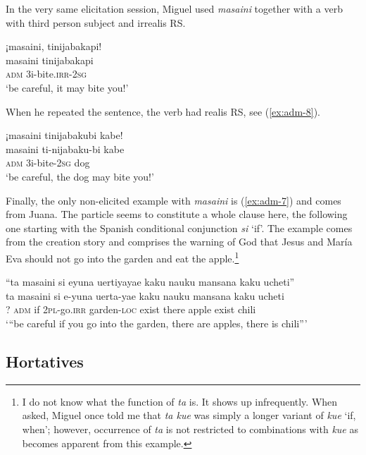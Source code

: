 In the very same elicitation session, Miguel used \textit{masaini} together with a verb with third person subject and irrealis RS.

\ea\label{ex:adm-6}
\begingl
\glpreamble ¡masaini, tinijabakapi!\\
\gla masaini tinijabakapi\\
\glb \textsc{adm} 3i-bite.\textsc{irr}-2\textsc{sg}\\
\glft ‘be careful, it may bite you!’
\endgl
\trailingcitation{[mrx-e150219s.148]}
\xe

When he repeated the sentence, the verb had realis RS, see (\ref{ex:adm-8}).

\ea\label{ex:adm-8}
\begingl
\glpreamble ¡masaini tinijabakubi kabe!\\
\gla masaini ti-nijabaku-bi kabe\\
\glb \textsc{adm} 3i-bite-2\textsc{sg} dog\\
\glft ‘be careful, the dog may bite you!’
\endgl
\trailingcitation{[mrx-e150219s.149]}
\xe
{}

Finally, the only non-elicited example with \textit{masaini} is (\ref{ex:adm-7}) and comes from Juana. The particle seems to constitute a whole clause here, the following one starting with the Spanish conditional conjunction \textit{si} ‘if’. The example comes from the creation story and comprises the warning of God that Jesus and María Eva should not go into the garden and eat the apple.\footnote{I do not know what the function of \textit{ta} is. It shows up infrequently. When asked, Miguel once told me that \textit{ta kue} was simply a longer variant of \textit{kue} ‘if, when’; however, occurrence of \textit{ta} is not restricted to combinations with \textit{kue} as becomes apparent from this example.}

\ea\label{ex:adm-7}
\begingl
\glpreamble “ta masaini si eyuna uertiyayae kaku nauku mansana kaku ucheti”\\
\gla ta masaini si e-yuna uerta-yae kaku nauku mansana kaku ucheti\\
\glb ? \textsc{adm} if 2\textsc{pl}-go.\textsc{irr} garden-\textsc{loc} exist there apple exist chili\\
\glft ‘“be careful if you go into the garden, there are apples, there is chili”’
\endgl
\trailingcitation{[jxx-n101013s-1.371-373]}
\xe



\subsection{Hortatives}\label{sec:Hortatives}

